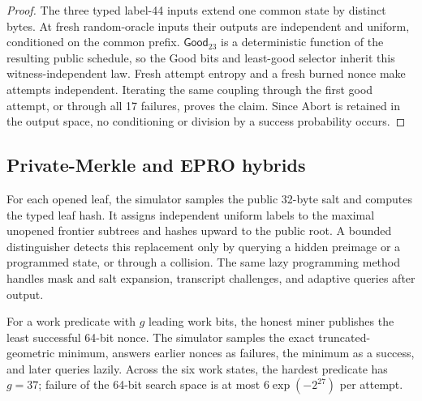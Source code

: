 \begin{proof}
The three typed label-44 inputs extend one common state by distinct bytes.
At fresh random-oracle inputs their outputs are independent and uniform,
conditioned on the common prefix.  \(\mathsf{Good}_{23}\) is a deterministic function of the
resulting public schedule, so the Good bits and least-good selector inherit
this witness-independent law.  Fresh attempt entropy and a fresh burned nonce
make attempts independent.  Iterating the same coupling through the first
good attempt, or through all 17 failures, proves the claim.  Since Abort is
retained in the output space, no conditioning or division by a success
probability occurs.
\end{proof}

\subsection{Private-Merkle and EPRO hybrids}

For each opened leaf, the simulator samples the public 32-byte salt and
computes the typed leaf hash.  It assigns independent uniform labels to the
maximal unopened frontier subtrees and hashes upward to the public root.  A
bounded distinguisher detects this replacement only by querying a hidden
preimage or a programmed state, or through a collision.  The same lazy
programming method handles mask and salt expansion, transcript challenges,
and adaptive queries after output.

For a work predicate with \(g\) leading work bits, the honest miner publishes
the least successful 64-bit nonce.  The simulator samples the exact
truncated-geometric minimum, answers earlier nonces as failures, the minimum
as a success, and later queries lazily.  Across the six work states, the
hardest predicate has \(g=37\); failure of the 64-bit search space is at most
\(6\exp(-2^{27})\) per attempt.

